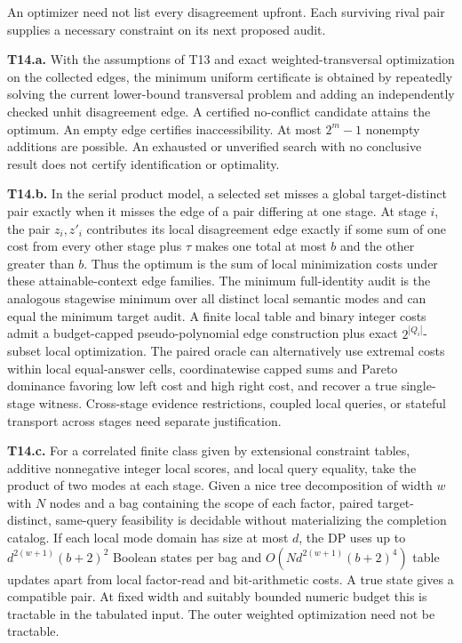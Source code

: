 An optimizer need not list every disagreement upfront. Each surviving rival pair supplies a necessary constraint on its next proposed audit.

\begin{theorem}\label{thm:t14}

\label{thm:t14a}

\textbf{T14.a.} With the assumptions of T13 and exact weighted-transversal optimization on the collected edges, the minimum uniform certificate is obtained by repeatedly solving the current lower-bound transversal problem and adding an independently checked unhit disagreement edge. A certified no-conflict candidate attains the optimum. An empty edge certifies inaccessibility. At most \(2^{m}-1\) nonempty additions are possible. An exhausted or unverified search with no conclusive result does not certify identification or optimality.

\label{thm:t14b}

\textbf{T14.b.} In the serial product model, a selected set misses a global target-distinct pair exactly when it misses the edge of a pair differing at one stage. At stage \(i\), the pair \(z_i,z'_i\) contributes its local disagreement edge exactly if some sum of one cost from every other stage plus \(\tau\) makes one total at most \(b\) and the other greater than \(b\). Thus the optimum is the sum of local minimization costs under these attainable-context edge families. The minimum full-identity audit is the analogous stagewise minimum over all distinct local semantic modes and can equal the minimum target audit. A finite local table and binary integer costs admit a budget-capped pseudo-polynomial edge construction plus exact \(2^{|Q_i|}\)-subset local optimization. The paired oracle can alternatively use extremal costs within local equal-answer cells, coordinatewise capped sums and Pareto dominance favoring low left cost and high right cost, and recover a true single-stage witness. Cross-stage evidence restrictions, coupled local queries, or stateful transport across stages need separate justification.

\label{thm:t14c}

\textbf{T14.c.} For a correlated finite class given by extensional constraint tables, additive nonnegative integer local scores, and local query equality, take the product of two modes at each stage. Given a nice tree decomposition of width \(w\) with \(N\) nodes and a bag containing the scope of each factor, paired target-distinct, same-query feasibility is decidable without materializing the completion catalog. If each local mode domain has size at most \(d\), the DP uses up to \(d^{2(w+1)}(b+2)^2\) Boolean states per bag and \(O(N d^{2(w+1)}(b+2)^4)\) table updates apart from local factor-read and bit-arithmetic costs. A true state gives a compatible pair. At fixed width and suitably bounded numeric budget this is tractable in the tabulated input. The outer weighted optimization need not be tractable.

\end{theorem}

